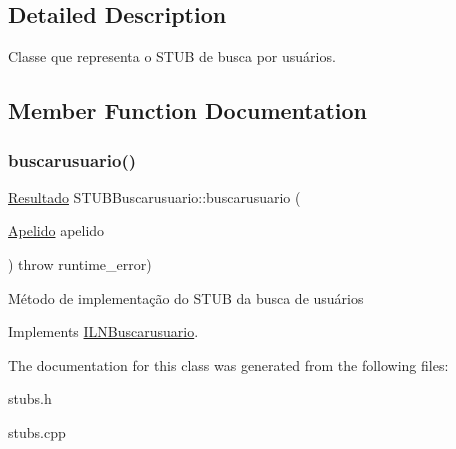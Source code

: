 \subsection{Detailed Description}
Classe que representa o S\+T\+UB de busca por usuários. 

\subsection{Member Function Documentation}
\mbox{\label{classSTUBBuscarusuario_a560dc5bf8f0a64163502ab496046c985}} 
\subsubsection{\texorpdfstring{buscarusuario()}{buscarusuario()}}
{\footnotesize\ttfamily \hyperlink{classResultado}{Resultado} S\+T\+U\+B\+Buscarusuario\+::buscarusuario (\begin{DoxyParamCaption}\item[{\hyperlink{classApelido}{Apelido}}]{apelido }\end{DoxyParamCaption}) throw  runtime\+\_\+error) \hspace{0.3cm}{\ttfamily [virtual]}}

Método de implementação do S\+T\+UB da busca de usuários 

Implements \hyperlink{classILNBuscarusuario}{I\+L\+N\+Buscarusuario}.



The documentation for this class was generated from the following files\+:\begin{DoxyCompactItemize}
\item 
stubs.\+h\item 
stubs.\+cpp\end{DoxyCompactItemize}
